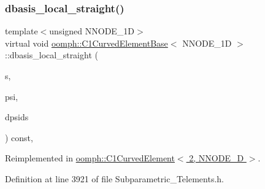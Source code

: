 \subsubsection{\texorpdfstring{dbasis\+\_\+local\+\_\+straight()}{dbasis\_local\_straight()}}
{\footnotesize\ttfamily template$<$unsigned N\+N\+O\+D\+E\+\_\+1D$>$ \\
virtual void \hyperlink{classoomph_1_1C1CurvedElementBase}{oomph\+::\+C1\+Curved\+Element\+Base}$<$ N\+N\+O\+D\+E\+\_\+1D $>$\+::dbasis\+\_\+local\+\_\+straight (\begin{DoxyParamCaption}\item[{const \hyperlink{classoomph_1_1Vector}{Vector}$<$ double $>$ \&}]{s,  }\item[{\hyperlink{classoomph_1_1Shape}{Shape} \&}]{psi,  }\item[{\hyperlink{classoomph_1_1DShape}{D\+Shape} \&}]{dpsids }\end{DoxyParamCaption}) const\hspace{0.3cm}{\ttfamily [inline]}, {\ttfamily [virtual]}}



Reimplemented in \hyperlink{classoomph_1_1C1CurvedElement_3_012_00_01NNODE__1D_01_4_af4a862475f941e4bc210e8e366d5dffc}{oomph\+::\+C1\+Curved\+Element$<$ 2, N\+N\+O\+D\+E\+\_\+D $>$}.



Definition at line 3921 of file Subparametric\+\_\+\+Telements.\+h.

\mbox{\label{classoomph_1_1C1CurvedElementBase_a6411596e17d98cdd0691b6de6e5319d5}} 
